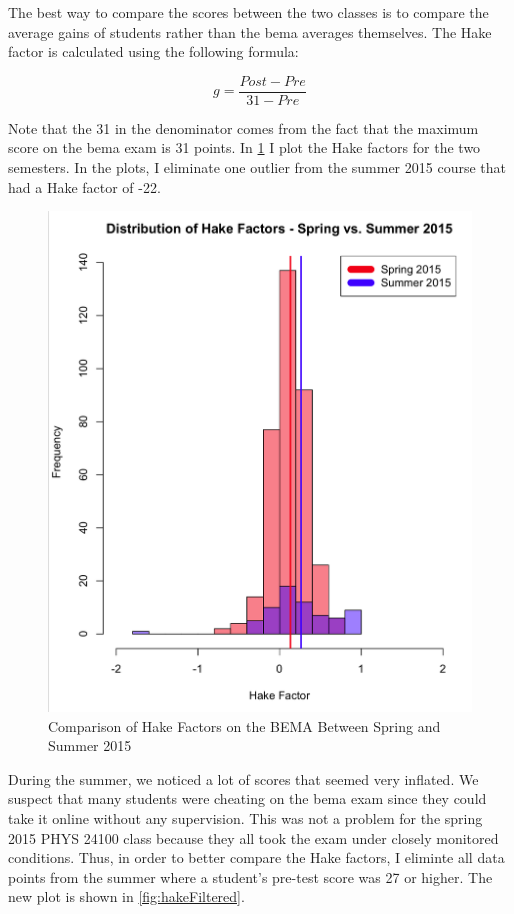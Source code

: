 The best way to compare the scores between the two classes is to compare the average gains of students rather than the \gls{bema} averages themselves. The Hake factor is calculated using the following formula:

\begin{equation}
	g = \frac{Post - Pre}{31 - Pre}
\end{equation}

Note that the 31 in the denominator comes from the fact that the maximum score on the \gls{bema} exam is 31 points. In \ref{fig:hakeFull} I plot the Hake factors for the two semesters. In the plots, I eliminate one outlier from the summer 2015 course that had a Hake factor of -22.

\begin{figure}[!htb]
	\centering
	\includegraphics[width=6in]{img/chapter4/hake_spring_vs_summer_full}
	\caption[Comparison of Hake Factors on the BEMA Between Spring and Summer 2015]{Comparison of Hake Factors on the BEMA Between Spring and Summer 2015}
  \label{fig:hakeFull}
\end{figure}

During the summer, we noticed a lot of scores that seemed very inflated. We suspect that many students were cheating on the \gls{bema} exam since they could take it online without any supervision. This was not a problem for the spring 2015 PHYS 24100 class because they all took the exam under closely monitored conditions. Thus, in order to better compare the Hake factors, I eliminte all data points from the summer where a student's pre-test score was 27 or higher. The new plot is shown in \ref{fig:hakeFiltered}.

